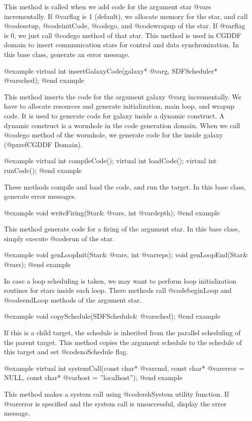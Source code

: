 This method is called when we add code for the argument star @var{s}
incrementally. If @var{flag} is 1 (default), we allocate memory for the star, 
and call @code{setup}, @code{initCode}, @code{go}, and @code{wrapup} of
the star. If @var{flag} is 0, we just call @code{go} method of that star.
This method is used in CGDDF domain to insert communication stars for
control and data synchronization. In this base class, generate an error
message.

@example
virtual int insertGalaxyCode(galaxy* @var{g}, SDFScheduler* @var{sched});
@end example

This method inserts the code for the argument galaxy @var{g} incrementally.
We have to allocate resources and generate initialization, main loop, and
wrapup code. It is used to generate code for galaxy inside a dynamic
construct. A dynamic construct is a wormhole in the code generation domain.
When we call @code{go} method of the wormhole, we generate code
for the inside galaxy (@pxref{CGDDF Domain}).

@example
virtual int compileCode();
virtual int loadCode();
virtual int runCode();
@end example

These methods compile and load the code, and run the target. In this base
class, generate error messages.

@example
void writeFiring(Star& @var{s}, int @var{depth});
@end example

This method generate code for a firing of the argument star. In this base
class, simply execute @code{run} of the star.

@example
void genLoopInit(Star& @var{s}, int @var{reps});
void genLoopEnd(Star& @var{s});
@end example

In case a loop scheduling is taken, we may want to perform loop
initialization routines for stars inside each loop. There methods
call @code{beginLoop} and @code{endLoop} methods of the argument
star.

@example
void copySchedule(SDFSchedule& @var{sched});
@end example

If this is a child target, the schedule is inherited from the parallel
scheduling of the parent target. This method copies the argument
schedule to the schedule of this target and set @code{noSchedule} flag.

@example
virtual int systemCall(const char* @var{cmd}, const char* @var{error} = NULL, const char* @var{host} = ''localhost'');
@end example

This method makes a system call using @code{rshSystem} utility function.
If @var{error} is specified and the system call is unsuccessful, display the
error message.

